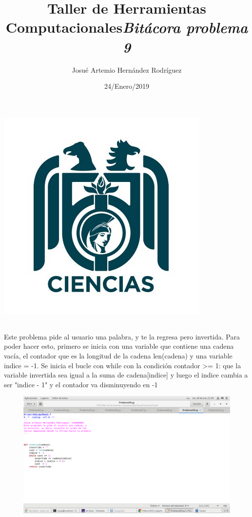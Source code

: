 \label{key}\documentclass[letterpaper, 12pt,oneside]{article}
\title{\Huge Taller de Herramientas Computacionales}
\author{Josué Artemio Hernández Rodríguez}
\date{24/Enero/2019}
\begin{document}
	\maketitle
	\begin{center}
		\includegraphics[scale=0.7]{3.jpg}
	\end{center}

	\newpage
	
	\title{\huge \textit{Bitácora problema 9 }}\\

	Este problema pide al usuario una palabra, y te la regresa pero invertida. Para poder hacer esto, primero se inicia con una variable que contiene una cadena vacía, el contador que es la longitud de la cadena len(cadena) y una variable indice = -1. Se inicia el bucle con while con la condición contador >= 1: que la variable invertida sea igual a la suma de cadena[indice] y luego el indice cambia a ser "indice - 1" y el contador va disminuyendo en -1 
	
	
	
	
	
	
	  
	 

	\begin{figure}[h]
		\includegraphics[scale=0.4]{pro09.png}
		
	\end{figure}

	
	
\end{document}

